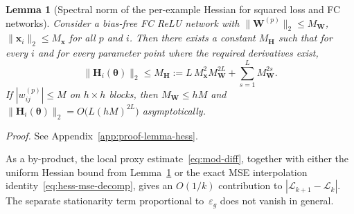 \documentclass[10pt,letterpaper]{article}
\newtheorem{lemma}{Lemma}
\theoremstyle{definition}
\begin{document}
\begin{lemma}[Spectral norm of the per-example Hessian for squared loss and FC networks]\label{lem:hess-mse}
Consider a bias-free FC ReLU network with
$\|\mathbf{W}^{(p)}\|_2 \le M_{\mathbf{W}}$, $\|\mathbf{x}_i\|_2 \le M_{\mathbf{x}}$ for all $p$ and $i$.
Then there exists a constant $M_{\mathbf{H}}$ such that for every $i$ and for every parameter point where the required derivatives exist,
\begin{equation}\label{eq:Mh-bound}
  \bigl\| \mathbf{H}_i(\boldsymbol{\theta}) \bigr\|_2 \le M_{\mathbf{H}}
  := L\, M_{\mathbf{x}}^2 M_{\mathbf{W}}^{2L}
  + \sum_{s=1}^{L} M_{\mathbf{W}}^{2s} .
\end{equation}
If $|w_{ij}^{(p)}|\le M$ on $h\times h$ blocks, then $M_{\mathbf{W}}\le hM$ and
$\|\mathbf{H}_i(\boldsymbol{\theta})\|_2 = O\!\bigl(L(hM)^{2L}\bigr)$ asymptotically.
\end{lemma}
\noindent\textit{Proof.} See Appendix~\ref{app:proof-lemma-hess}.

As a by-product, the local proxy estimate~\eqref{eq:mod-diff}, together with either the uniform Hessian bound from Lemma~\ref{lem:hess-mse} or the exact MSE interpolation identity~\eqref{eq:hess-mse-decomp}, gives an $O(1/k)$ contribution to $|\mathcal{L}_{k+1}-\mathcal{L}_k|$. The separate stationarity term proportional to~$\varepsilon_g$ does not vanish in general.
\end{document}
